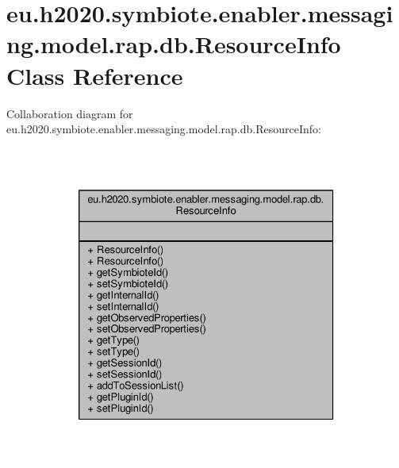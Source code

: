 \hypertarget{classeu_1_1h2020_1_1symbiote_1_1enabler_1_1messaging_1_1model_1_1rap_1_1db_1_1ResourceInfo}{}\section{eu.\+h2020.\+symbiote.\+enabler.\+messaging.\+model.\+rap.\+db.\+Resource\+Info Class Reference}
\label{classeu_1_1h2020_1_1symbiote_1_1enabler_1_1messaging_1_1model_1_1rap_1_1db_1_1ResourceInfo}


Collaboration diagram for eu.\+h2020.\+symbiote.\+enabler.\+messaging.\+model.\+rap.\+db.\+Resource\+Info\+:
\nopagebreak
\begin{figure}[H]
\begin{center}
\leavevmode
\includegraphics[width=326pt]{classeu_1_1h2020_1_1symbiote_1_1enabler_1_1messaging_1_1model_1_1rap_1_1db_1_1ResourceInfo__coll__graph}
\end{center}
\end{figure}
